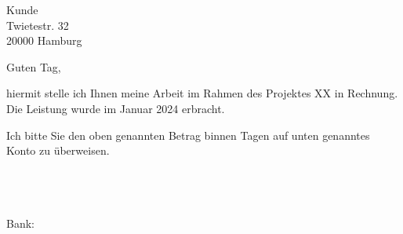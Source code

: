 \documentclass[DIN,version=last]{scrlttr2}
\begin{document}
\begin{letter}{Kunde\\Twietestr. 32\\20000 Hamburg}

\opening{Guten Tag,}

hiermit stelle ich Ihnen meine Arbeit im Rahmen des Projektes XX in Rechnung. Die Leistung wurde im Januar 2024 erbracht.


\vspace{\baselineskip}
\PrintInvoiceTabular

Ich bitte Sie den oben genannten Betrag binnen \paymentdays{} Tagen auf unten genanntes Konto zu überweisen.

 \tab{}\\
 \tab{}\\
 \tab{}\\
Bank: \tab{}\\

 \\
 

\end{letter}
\end{document}
